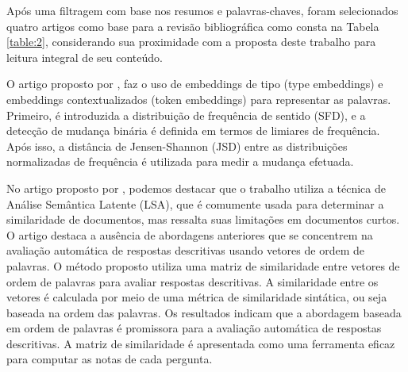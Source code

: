 
Após uma filtragem com base nos resumos e palavras-chaves, foram selecionados quatro artigos como base para a revisão bibliográfica como consta na Tabela \ref{table:2}, considerando sua proximidade com a proposta deste trabalho para leitura integral de seu conteúdo.

\begin{table}[htb!]
\caption{Tabela do funil de leitura.}
\label{table:2}
\end{table}

\newpage

O artigo proposto por \cite{UnsupervisedLexicalSemanticChangeDetection}, faz o uso de embeddings de tipo (type embeddings) e embeddings contextualizados (token embeddings) para representar as palavras. Primeiro, é introduzida a distribuição de frequência de sentido (SFD), e a detecção de mudança binária é definida em termos de limiares de frequência. Após isso, a distância de Jensen-Shannon (JSD) entre as distribuições normalizadas de frequência é utilizada para medir a mudança efetuada.
    
No artigo proposto por \cite{SyntacticSimilarityBasedSimilarityMatrixForEvaluatingDescriptiveAnswer}, podemos destacar que o trabalho utiliza a técnica de Análise Semântica Latente (LSA), que é comumente usada para determinar a similaridade de documentos, mas ressalta suas limitações em documentos curtos. O artigo destaca a ausência de abordagens anteriores que se concentrem na avaliação automática de respostas descritivas usando vetores de ordem de palavras. O método proposto utiliza uma matriz de similaridade entre vetores de ordem de palavras para avaliar respostas descritivas. A similaridade entre os vetores é calculada por meio de uma métrica de similaridade sintática, ou seja baseada na ordem das palavras. Os resultados indicam que a abordagem baseada em ordem de palavras é promissora para a avaliação automática de respostas descritivas. A matriz de similaridade é apresentada como uma ferramenta eficaz para computar as notas de cada pergunta.
    
